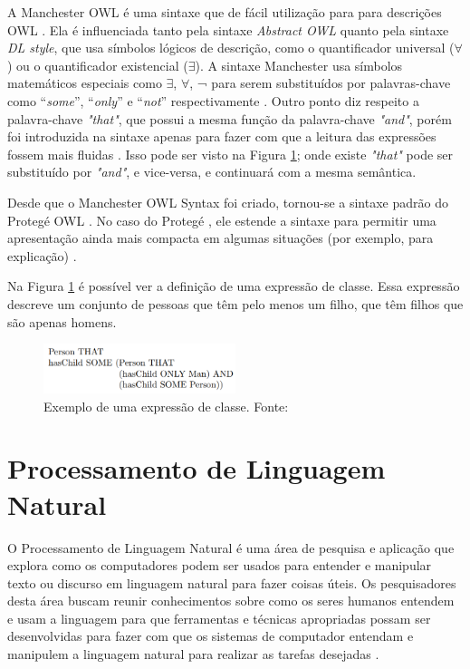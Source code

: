 \documentclass{bcc}
\begin{document}
A Manchester OWL é uma sintaxe que de fácil utilização para para descrições OWL \cite{horridge2009}. Ela é influenciada tanto pela sintaxe \textit{Abstract OWL} quanto pela sintaxe \textit{DL style}, que usa símbolos lógicos de descrição, como o quantificador universal ($\forall$) ou o quantificador existencial ($\exists$). A sintaxe  Manchester usa símbolos matemáticos especiais como $\exists$, $\forall$, ¬ para serem substituídos por palavras-chave como “\textit{some}”, “\textit{only}” e “\textit{not}” respectivamente \cite{yauri2012}. Outro ponto diz respeito a palavra-chave \textit{"that"}, que possui a mesma função da palavra-chave \textit{"and"}, porém foi introduzida na sintaxe apenas para fazer com que a leitura das expressões fossem mais fluidas \cite{horridge2006}. Isso pode ser visto na Figura \ref{fig:manchester_exemplo}; onde existe \textit{"that"} pode ser substituído por \textit{"and"}, e vice-versa, e continuará com a mesma semântica.

Desde que o Manchester OWL Syntax foi criado, tornou-se a sintaxe padrão do Protegé OWL \cite{horridge2006}. No caso do Protegé \cite{noy2001}, ele estende a sintaxe para permitir uma apresentação ainda mais compacta em algumas situações (por exemplo, para explicação) \cite{horridge2009}.

Na Figura \ref{fig:manchester_exemplo} é possível ver a definição de uma expressão de classe. Essa expressão descreve um conjunto de pessoas que têm pelo menos um filho, que têm filhos que são apenas homens.

\begin{figure}[H]
\centering
\includegraphics[width=0.5\textwidth]{Figuras/manchester_exemplo.png}
\caption{Exemplo de uma expressão de classe. Fonte: \cite{horridge2006}}
\label{fig:manchester_exemplo}
\end{figure}

\section{Processamento de Linguagem Natural}

O Processamento de Linguagem Natural é uma área de pesquisa e aplicação que explora como os computadores podem ser usados para entender e manipular texto ou discurso em linguagem natural para fazer coisas úteis. Os pesquisadores desta área buscam reunir conhecimentos sobre como os seres humanos entendem e usam a linguagem para que ferramentas e técnicas apropriadas possam ser desenvolvidas para fazer com que os sistemas de computador entendam e manipulem a linguagem natural para realizar as tarefas desejadas \cite{chowdhury2003}.
\end{document}
